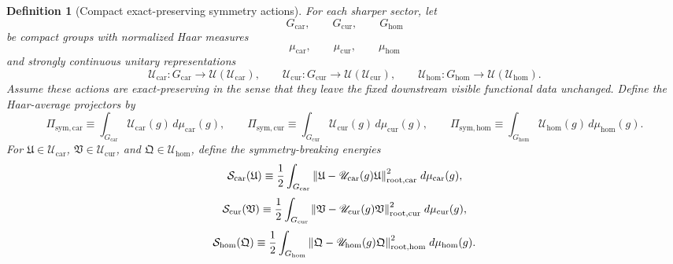 \documentclass[11pt]{article}
\newcommand{\RootTensorClass}{\mathscr U_{\mathrm{car}}}
\newcommand{\RootRelabelClass}{\mathscr U_{\mathrm{cur}}}
\newcommand{\RootFreeClass}{\mathscr U_{\mathrm{hom}}}
\newcommand{\RootTensor}{\mathfrak U}
\newcommand{\RootRelabel}{\mathfrak V}
\newcommand{\RootFree}{\mathfrak Q}
\newcommand{\TensorSymProj}{\Pi_{\mathrm{sym,car}}}
\newcommand{\CurSymProj}{\Pi_{\mathrm{sym,cur}}}
\newcommand{\HomSymProj}{\Pi_{\mathrm{sym,hom}}}
\newcommand{\TensorSymAct}{\mathscr U_{\mathrm{car}}}
\newcommand{\CurSymAct}{\mathscr U_{\mathrm{cur}}}
\newcommand{\HomSymAct}{\mathscr U_{\mathrm{hom}}}
\newtheorem{definition}{Definition}
\begin{document}
\begin{definition}[Compact exact-preserving symmetry actions]
\label{def:symmetry_actions}
For each sharper sector, let
\[
G_{\mathrm{car}},\qquad
G_{\mathrm{cur}},\qquad
G_{\mathrm{hom}}
\]
be compact groups with normalized Haar measures
\[
\mu_{\mathrm{car}},\qquad
\mu_{\mathrm{cur}},\qquad
\mu_{\mathrm{hom}}
\]
and strongly continuous unitary representations
\[
\TensorSymAct:G_{\mathrm{car}}\to\mathcal U(\RootTensorClass),\qquad
\CurSymAct:G_{\mathrm{cur}}\to\mathcal U(\RootRelabelClass),\qquad
\HomSymAct:G_{\mathrm{hom}}\to\mathcal U(\RootFreeClass).
\]
Assume these actions are exact-preserving in the sense that they leave the fixed downstream visible functional data unchanged. Define the Haar-average projectors by
\begin{equation}
\TensorSymProj
\equiv
\int_{G_{\mathrm{car}}}\TensorSymAct(g)\,d\mu_{\mathrm{car}}(g),
\qquad
\CurSymProj
\equiv
\int_{G_{\mathrm{cur}}}\CurSymAct(g)\,d\mu_{\mathrm{cur}}(g),
\qquad
\HomSymProj
\equiv
\int_{G_{\mathrm{hom}}}\HomSymAct(g)\,d\mu_{\mathrm{hom}}(g).
\label{eq:haar_projectors}
\end{equation}
For \(\RootTensor\in\RootTensorClass\), \(\RootRelabel\in\RootRelabelClass\), and \(\RootFree\in\RootFreeClass\), define the symmetry-breaking energies
\begin{equation}
\mathcal S_{\mathrm{car}}(\RootTensor)
\equiv
\frac12\int_{G_{\mathrm{car}}}
\norm{\RootTensor-\TensorSymAct(g)\RootTensor}_{\mathrm{root,car}}^2
\;d\mu_{\mathrm{car}}(g),
\label{eq:scar}
\end{equation}
\begin{equation}
\mathcal S_{\mathrm{cur}}(\RootRelabel)
\equiv
\frac12\int_{G_{\mathrm{cur}}}
\norm{\RootRelabel-\CurSymAct(g)\RootRelabel}_{\mathrm{root,cur}}^2
\;d\mu_{\mathrm{cur}}(g),
\label{eq:scur}
\end{equation}
\begin{equation}
\mathcal S_{\mathrm{hom}}(\RootFree)
\equiv
\frac12\int_{G_{\mathrm{hom}}}
\norm{\RootFree-\HomSymAct(g)\RootFree}_{\mathrm{root,hom}}^2
\;d\mu_{\mathrm{hom}}(g).
\label{eq:shom}
\end{equation}
\end{definition}
\end{document}
